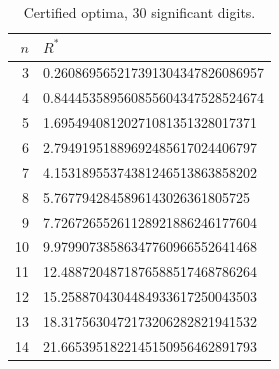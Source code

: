 \begin{table}
\centering
\begin{tabular}{rl}
\toprule
$n$ & $R^*$ \\
\midrule
3 & 0.260869565217391304347826086957 \\
4 & 0.844453589560855604347528524674 \\
5 & 1.69549408120271081351328017371 \\
6 & 2.79491951889692485617024406797 \\
7 & 4.15318955374381246513863858202 \\
8 & 5.7677942845896143026361805725 \\
9 & 7.72672655261128921886246177604 \\
10 & 9.97990738586347760966552641468 \\
11 & 12.4887204871876588517468786264 \\
12 & 15.2588704304484933617250043503 \\
13 & 18.3175630472173206282821941532 \\
14 & 21.6653951822145150956462891793 \\
\bottomrule
\end{tabular}
\caption{Certified optima, 30 significant digits.}
\end{table}

